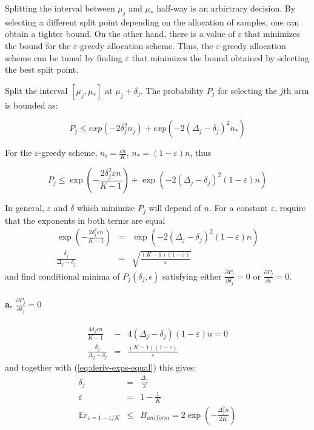 \documentclass{article}
\newcommand {\IE} {\ensuremath {\mathbb{E}}}
\begin{document}
Splitting the interval between $\mu_j$ and $\mu_*$ half-way is an
arbirtrary decision. By selecting a different split point
depending on the allocation of samples, one can obtain a tighter
bound. On the other hand, there is a value of $\varepsilon$ that
minimizes the bound for the $\varepsilon$-greedy allocation scheme.
Thus, the  $\varepsilon$-greedy allocation scheme can be tuned by
finding $\varepsilon$ that minimizes the bound obtained by
selecting the best split point. 

Split the interval $[\mu_j, \mu_*]$ at $\mu_j+\delta_j$. The
probability $P_j$ for selecting the $j$th arm is bounded as:

\begin{equation}
P_j\le exp\left(-2\delta_j^2n_j\right)+exp\left(-2(\Delta_j-\delta_j)^2n_*\right)
\end{equation}

For the $\varepsilon$-greedy scheme, $n_i=\frac {\varepsilon n} K$,
$n_*=(1-\varepsilon)n$, thus

\begin{equation}
P_j \le \exp\left(-\frac {2\delta_j^2\varepsilon n} {K-1}\right) +\exp\left(-2(\Delta_j-\delta_j)^2(1-\varepsilon)n\right)
\end{equation}

In general, $\varepsilon$ and $\delta$ which minimize $P_j$ will
depend of $n$. For a constant $\varepsilon$, require that the
exponents in both terms are equal
\begin{eqnarray}
\exp\left(-\frac {2\delta_j^2\varepsilon n} {K-1}\right)
   &=& \exp\left(-2(\Delta_j-\delta_j)^2(1-\varepsilon)n\right)\\
\frac {\delta_j} {\Delta_j - \delta_j}
   &=& \sqrt { \frac {(K-1)(1-\varepsilon)} \varepsilon }
\label{eq:deriv-exps-equal}
\end{eqnarray}
and find conditional minima of $P_j(\delta_j, \epsilon)$ satisfying
either $\frac {\partial P_j} {\partial \delta_j}=0$ or $\frac {\partial P_j}
{\partial \varepsilon}=0$. 

\vspace{1em}
\paragraph{a. {\large $\frac {\partial P_j} {\partial \delta_j}=0$}}

\begin{eqnarray*}
\frac {4\delta_j\varepsilon n} {K-1}
  &-& 4(\Delta_j-\delta_j)(1-\varepsilon)n=0\\
\frac {\delta_j} {\Delta_j-\delta_j}&=&{ \frac {(K-1)(1-\varepsilon)} \varepsilon }
\end{eqnarray*}
and together with (\ref{eq:deriv-exps-equal}) this gives:
\begin{eqnarray}
\delta_j&=&\frac {\Delta_j} 2\nonumber\\
\varepsilon&=&1-\frac 1 K\nonumber\\
\IE r_{\varepsilon=1-1/K}&\le&B_{uniform}=2\exp\left(-\frac {\Delta_j^2n} {2K}\right)
\label{eq:deriv-uniform-sampling}
\end{eqnarray}
\end{document}
